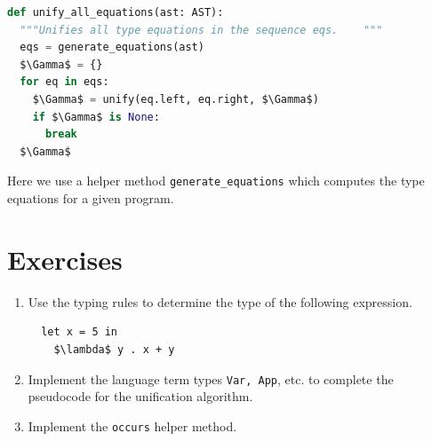\documentclass[book.tex]{subfiles}
\begin{document}
\begin{lstlisting}[language=python]
def unify_all_equations(ast: AST):
  """Unifies all type equations in the sequence eqs.    """
  eqs = generate_equations(ast)
  $\Gamma$ = {}
  for eq in eqs:
    $\Gamma$ = unify(eq.left, eq.right, $\Gamma$)
    if $\Gamma$ is None:
      break
  $\Gamma$
\end{lstlisting}
Here we use a helper method \lstinline{generate_equations} which computes the type equations for a given program.



\section{Exercises}

\begin{enumerate}
    \item Use the typing rules to determine the type of the following expression.
\begin{lstlisting}
  let x = 5 in
    $\lambda$ y . x + y
\end{lstlisting}
    \item Implement the language term types \lstinline{Var, App}, etc. to complete the pseudocode for the unification algorithm.
    \item Implement the \lstinline{occurs} helper method.
\end{enumerate}
\end{document}
